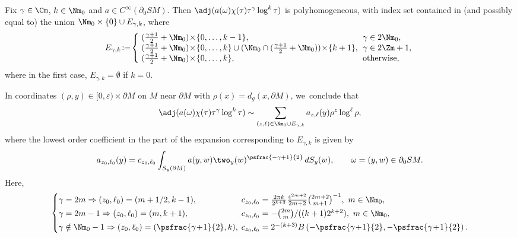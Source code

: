 \begin{Theorem}\label{thm:I0starIDX}
Fix $\gamma\in \Cm$, $k\in \Nm_0$ and $a\in C^\infty(\partial_0 SM)$. Then $\adj (a(\omega) \chi(\tau) \tau^\gamma \log^k \tau)$ is polyhomogeneous,
with index set contained in (and possibly equal to) the union $\Nm_0\times \{0\} \cup E_{\gamma,k}$, where
\begin{equation}\arraycolsep3pt
E_{\gamma,k} \!:=\! \left\{
\begin{array}{ll}
(\frac{\gamma+1}{2} + \Nm_0) \!\times\! \{0, \dots, k-1\}, & \gamma\in 2\Nm_0, \\
(\frac{\gamma+1}{2} + \Nm_0) \!\times\! \{0, \dots, k\} \cup (\Nm_0 \cap (\frac{\gamma+1}{2} + \Nm_0)) \!\times\! \{k+1\}, & \gamma\in 2\Zm+1, \\
(\frac{\gamma+1}{2} + \Nm_0) \!\times\! \{0, \dots, k\}, & \text{otherwise},
\end{array}
\right.
\label{eq:Egamk}
\end{equation}
where in the first case, $E_{\gamma,k} = \emptyset$ if $k=0$.

In coordinates $(\rho,y)\in [0,\varepsilon)\times \partial M$ on $M$ near $\partial M$
with $\rho(x) = d_g(x,\partial M)$, we~conclude that
\begin{equation*}
\adj (a(\omega) \chi(\tau) \tau^\gamma \log^k \tau) \sim \sum_{(z,\ell)\in \Nm_0 \cup E_{\gamma,k}} a_{z,\ell}(y) \rho^z \log^\ell \rho,
\end{equation*}
where the lowest order coefficient in the part of the expansion corresponding to $E_{\gamma,k}$ is given by
\begin{equation*}
a_{z_0,\ell_0}(y) = c_{z_0,\ell_0} \int_{S_y (\partial M)} a(y,w) \two_y(w)^{\psfrac{-\gamma+1}{2}}\,dS_y(w), \qquad \omega = (y,w)\in \partial_0 SM.
\end{equation*}
Here,
\begin{equation}
\begin{cases}
\gamma=2m \Rightarrow (z_0,\ell_0) = (m+1/2,k-1), &\hspace*{-2mm}c_{z_0,\ell_0} = \frac{2\pi k}{2^{k+3}} \frac{4^{2m+2}}{2m+2}\binom{2m+2}{m+1}^{-1},\ m\in\Nm_0, \\[0.5ex]
\gamma=2m-1 \Rightarrow (z_0,\ell_0) = (m, k+1), &\hspace*{-2mm} c_{z_0,\ell_0} = -\binom{2m}{m}/((k+1) 2^{k+2}), \ m\in\Nm_0, \\[0.5ex]
\gamma\notin \Nm_0-1 \Rightarrow (z_0,\ell_0) = (\psfrac{\gamma\!+\!1}{2},k), &\hspace*{-2mm} c_{z_0,\ell_0} = {2^{-(k+3)}}
B\left(-\psfrac{\gamma\!+\!1}{2}, -\psfrac{\gamma\!+\!1}{2} \right).
\end{cases}
\label{eq:Agk}
\end{equation}
\end{Theorem}

